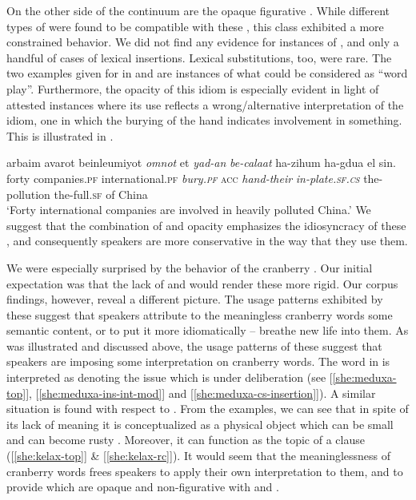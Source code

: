 \documentclass[output=paper]{langsci/langscibook}
\begin{document}
On the other side of the  continuum are the opaque figurative . While different types of  were found to be compatible with these , this class exhibited a more constrained behavior. We did not find any evidence for instances of , and only a handful of cases of lexical insertions. Lexical substitutions, too, were rare. The two examples given for  in  and  are instances of what could be considered as ``word play''. Furthermore, the opacity of this idiom is especially evident in light of attested instances where its use reflects a wrong/alternative interpretation of the idiom, one in which the burying of the hand indicates involvement in something. This is illustrated in .

	\ea\label{she:taman-wrong}
    	\gll {\alef}arba{\ayin}im {\het}avarot beinle{\alef}umiyot \textit{{\tet}omnot} {\alef}et \textit{yad-an} \textit{be-cala{\het}at} ha-zihum ha-gdu{\shin}a {\shin}el sin.\\
    	   forty companies.\textsc{pf} international.\textsc{pf} \textit{bury.\textsc{pf}} \textsc{acc} \textit{hand-their} \textit{in-plate.\textsc{sf.cs}} the-pollution the-full.\textsc{sf} of China\\
    	\glt `Forty  international companies are involved in heavily polluted China.'
	\z
We suggest that the combination of  and opacity emphasizes the idiosyncracy of these , and consequently speakers are more conservative in the way that they use them.

We were especially surprised by the behavior of the cranberry . Our initial expectation was that the lack of  and  would render these  more rigid. Our corpus findings, however, reveal a different picture. The usage patterns exhibited by these  suggest that speakers attribute to the meaningless cranberry words some semantic content, or to put it more idiomatically -- breathe new life into them. As was illustrated and discussed above, the usage patterns of these  suggest that speakers are imposing some interpretation on cranberry words. The word  in  is interpreted as denoting the issue which is under deliberation (see [\ref{she:meduxa-top}], [\ref{she:meduxa-ins-int-mod}] and [\ref{she:meduxa-cs-insertion}]). A similar situation is found with respect to . From the examples, we can see that in spite of its lack of meaning it is conceptualized as a physical object which can be small  and can become rusty . Moreover, it can function as the topic of a clause ([\ref{she:kelax-top}] \& [\ref{she:kelax-rc}]). It would seem that the meaninglessness of cranberry words frees speakers to apply their own interpretation  to them, and to provide  which are opaque and non-figurative with  and .
\end{document}
